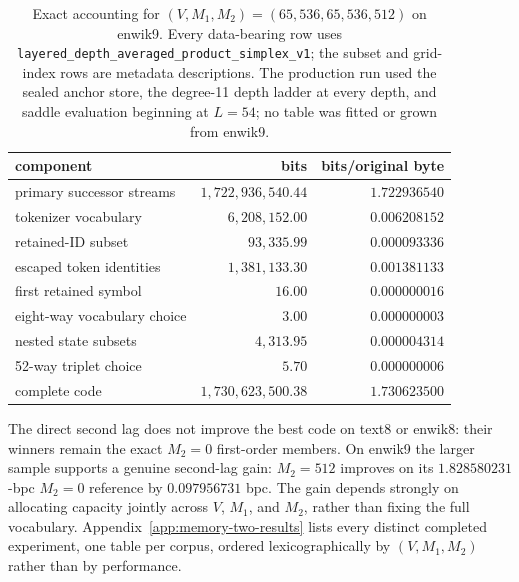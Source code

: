 \begin{table}[ht]
\centering
\small
\begin{tabular}{lrr}
\toprule
component & bits & bits/original byte \\
\midrule
primary successor streams & $1{,}722{,}936{,}540.44$ & $1.722936540$ \\
tokenizer vocabulary & $6{,}208{,}152.00$ & $0.006208152$ \\
retained-ID subset & $93{,}335.99$ & $0.000093336$ \\
escaped token identities & $1{,}381{,}133.30$ & $0.001381133$ \\
first retained symbol & $16.00$ & $0.000000016$ \\
eight-way vocabulary choice & $3.00$ & $0.000000003$ \\
nested state subsets & $4{,}313.95$ & $0.000004314$ \\
52-way triplet choice & $5.70$ & $0.000000006$ \\
\midrule
complete code & $1{,}730{,}623{,}500.38$ & $\mathbf{1.730623500}$ \\
\bottomrule
\end{tabular}
\caption{Exact accounting for
  $(V,M_1,M_2)=(65{,}536,65{,}536,512)$ on enwik9.  Every data-bearing row
  uses \texttt{layered\_depth\_averaged\_product\_simplex\_v1}; the subset
  and grid-index rows are metadata descriptions.  The production run used
  the sealed anchor store, the degree-11 depth ladder at every depth, and
  saddle evaluation beginning at $L=54$; no table was fitted or grown from
  enwik9.}
\label{tab:order-two-ledger}
\end{table}
\FloatBarrier

The direct second lag does not improve the best code on text8 or enwik8:
their winners remain the exact $M_2=0$ first-order members.  On enwik9 the
larger sample supports a genuine second-lag gain: $M_2=512$ improves on its
$1.828580231$-bpc $M_2=0$ reference by $0.097956731$ bpc.  The gain depends
strongly on allocating capacity jointly across $V$, $M_1$, and $M_2$, rather
than fixing the full vocabulary.  Appendix~\ref{app:memory-two-results}
lists every distinct completed experiment, one table per corpus, ordered
lexicographically by $(V,M_1,M_2)$ rather than by performance.
